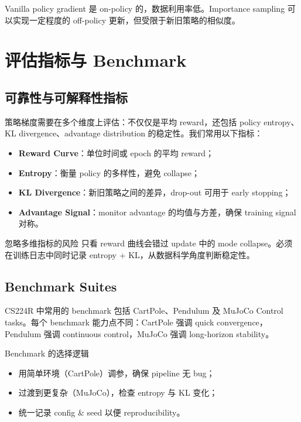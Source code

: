 \documentclass[a4paper]{article}
\begin{document}
Vanilla policy gradient 是 on-policy 的，数据利用率低。Importance sampling 可以实现一定程度的 off-policy 更新，但受限于新旧策略的相似度。

\section{评估指标与 Benchmark}
\subsection{可靠性与可解释性指标}
策略梯度需要在多个维度上评估：不仅仅是平均 reward，还包括 policy entropy、KL divergence、advantage distribution 的稳定性。我们常用以下指标：
\begin{itemize}
    \item \textbf{Reward Curve}：单位时间或 epoch 的平均 reward；
    \item \textbf{Entropy}：衡量 policy 的多样性，避免 collapse；
    \item \textbf{KL Divergence}：新旧策略之间的差异，drop-out 可用于 early stopping；
    \item \textbf{Advantage Signal}：monitor advantage 的均值与方差，确保 training signal 对称。
\end{itemize}

\begin{warningbox}{忽略多维指标的风险}
只看 reward 曲线会错过 update 中的 mode collapse。必须在训练日志中同时记录 entropy + KL，从数据科学角度判断稳定性。
\end{warningbox}

\subsection{Benchmark Suites}
CS224R 中常用的 benchmark 包括 CartPole、Pendulum 及 MuJoCo Control tasks。每个 benchmark 能力点不同：CartPole 强调 quick convergence，Pendulum 强调 continuous control，MuJoCo 强调 long-horizon stability。

\begin{importantbox}{Benchmark 的选择逻辑}
\begin{itemize}
    \item 用简单环境（CartPole）调参，确保 pipeline 无 bug；
    \item 过渡到更复杂（MuJoCo），检查 entropy 与 KL 变化；
\item 统一记录 config \& seed 以便 reproducibility。
\end{itemize}
\end{importantbox}
\end{document}
